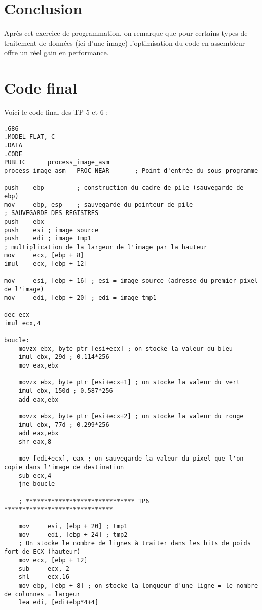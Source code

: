 \chapter{Conclusion}
Après cet exercice de programmation, on remarque que pour certains types de traitement de données (ici d'une image) l'optimisation du code en assembleur offre un réel gain en performance. 

\appendix
\chapter{Code final}

\noindent Voici le code final des TP 5 et 6 :

\assembly
\begin{lstlisting}
.686
.MODEL FLAT, C
.DATA
.CODE
PUBLIC      process_image_asm
process_image_asm   PROC NEAR       ; Point d'entrée du sous programme

push    ebp         ; construction du cadre de pile (sauvegarde de ebp)
mov     ebp, esp    ; sauvegarde du pointeur de pile
; SAUVEGARDE DES REGISTRES
push    ebx
push    esi ; image source
push    edi ; image tmp1
; multiplication de la largeur de l'image par la hauteur
mov     ecx, [ebp + 8]
imul    ecx, [ebp + 12]

mov     esi, [ebp + 16] ; esi = image source (adresse du premier pixel de l'image)
mov     edi, [ebp + 20] ; edi = image tmp1

dec ecx
imul ecx,4

boucle: 
    movzx ebx, byte ptr [esi+ecx] ; on stocke la valeur du bleu
    imul ebx, 29d ; 0.114*256
    mov eax,ebx

    movzx ebx, byte ptr [esi+ecx+1] ; on stocke la valeur du vert
    imul ebx, 150d ; 0.587*256
    add eax,ebx

    movzx ebx, byte ptr [esi+ecx+2] ; on stocke la valeur du rouge
    imul ebx, 77d ; 0.299*256
    add eax,ebx
    shr eax,8

    mov [edi+ecx], eax ; on sauvegarde la valeur du pixel que l'on copie dans l'image de destination
    sub ecx,4
    jne boucle

    ; ****************************** TP6 ******************************

    mov     esi, [ebp + 20] ; tmp1
    mov     edi, [ebp + 24] ; tmp2
    ; On stocke le nombre de lignes à traiter dans les bits de poids fort de ECX (hauteur)
    mov ecx, [ebp + 12]
    sub     ecx, 2
    shl     ecx,16
    mov ebp, [ebp + 8] ; on stocke la longueur d'une ligne = le nombre de colonnes = largeur
    lea edi, [edi+ebp*4+4]


\end{lstlisting}
